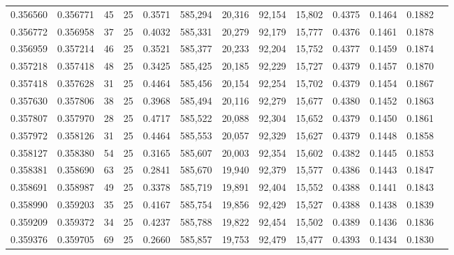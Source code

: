 \begin{tabular}{rrrrrrrrrrrrr}
0.356560 & 0.356771 &    45 &  25 &                                     0.3571 & 585,294 &  20,316 &  92,154 &  15,802 & 0.4375 & 0.1464 & 0.1882 \\
0.356772 & 0.356958 &    37 &  25 &                                     0.4032 & 585,331 &  20,279 &  92,179 &  15,777 & 0.4376 & 0.1461 & 0.1878 \\
0.356959 & 0.357214 &    46 &  25 &                                     0.3521 & 585,377 &  20,233 &  92,204 &  15,752 & 0.4377 & 0.1459 & 0.1874 \\
0.357218 & 0.357418 &    48 &  25 &                                     0.3425 & 585,425 &  20,185 &  92,229 &  15,727 & 0.4379 & 0.1457 & 0.1870 \\
0.357418 & 0.357628 &    31 &  25 &                                     0.4464 & 585,456 &  20,154 &  92,254 &  15,702 & 0.4379 & 0.1454 & 0.1867 \\
0.357630 & 0.357806 &    38 &  25 &                                     0.3968 & 585,494 &  20,116 &  92,279 &  15,677 & 0.4380 & 0.1452 & 0.1863 \\
0.357807 & 0.357970 &    28 &  25 &                                     0.4717 & 585,522 &  20,088 &  92,304 &  15,652 & 0.4379 & 0.1450 & 0.1861 \\
0.357972 & 0.358126 &    31 &  25 &                                     0.4464 & 585,553 &  20,057 &  92,329 &  15,627 & 0.4379 & 0.1448 & 0.1858 \\
0.358127 & 0.358380 &    54 &  25 &                                     0.3165 & 585,607 &  20,003 &  92,354 &  15,602 & 0.4382 & 0.1445 & 0.1853 \\
0.358381 & 0.358690 &    63 &  25 &                                     0.2841 & 585,670 &  19,940 &  92,379 &  15,577 & 0.4386 & 0.1443 & 0.1847 \\
0.358691 & 0.358987 &    49 &  25 &                                     0.3378 & 585,719 &  19,891 &  92,404 &  15,552 & 0.4388 & 0.1441 & 0.1843 \\
0.358990 & 0.359203 &    35 &  25 &                                     0.4167 & 585,754 &  19,856 &  92,429 &  15,527 & 0.4388 & 0.1438 & 0.1839 \\
0.359209 & 0.359372 &    34 &  25 &                                     0.4237 & 585,788 &  19,822 &  92,454 &  15,502 & 0.4389 & 0.1436 & 0.1836 \\
0.359376 & 0.359705 &    69 &  25 &                                     0.2660 & 585,857 &  19,753 &  92,479 &  15,477 & 0.4393 & 0.1434 & 0.1830 \\

\end{tabular}
